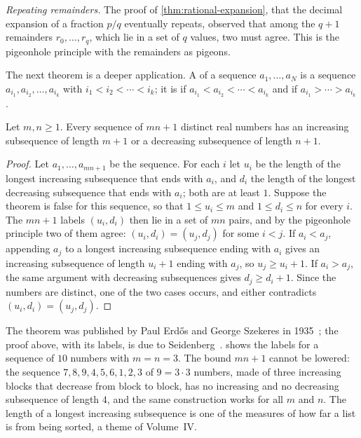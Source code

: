 \emph{Repeating remainders.} The proof of \cref{thm:rational-expansion}, that the decimal expansion of a fraction $p/q$ eventually repeats, observed that among the $q+1$ remainders $r_0,\ldots,r_q$, which lie in a set of $q$ values, two must agree. This is the pigeonhole principle with the remainders as pigeons.

The next theorem is a deeper application. A  of a sequence $a_1,\ldots,a_N$ is a sequence $a_{i_1},a_{i_2},\ldots,a_{i_k}$ with $i_1<i_2<\cdots<i_k$; it is  if $a_{i_1}<a_{i_2}<\cdots<a_{i_k}$ and  if $a_{i_1}>\cdots>a_{i_k}$.

\begin{theorem}
\label{thm:erdos-szekeres}
Let $m,n\ge1$. Every sequence of $mn+1$ distinct real numbers has an increasing subsequence of length $m+1$ or a decreasing subsequence of length $n+1$.
\end{theorem}

\begin{proof}
Let $a_1,\ldots,a_{mn+1}$ be the sequence. For each $i$ let $u_i$ be the length of the longest increasing subsequence that ends with $a_i$, and $d_i$ the length of the longest decreasing subsequence that ends with $a_i$; both are at least $1$. Suppose the theorem is false for this sequence, so that $1\le u_i\le m$ and $1\le d_i\le n$ for every $i$. The $mn+1$ labels $(u_i,d_i)$ then lie in a set of $mn$ pairs, and by the pigeonhole principle two of them agree: $(u_i,d_i)=(u_j,d_j)$ for some $i<j$. If $a_i<a_j$, appending $a_j$ to a longest increasing subsequence ending with $a_i$ gives an increasing subsequence of length $u_i+1$ ending with $a_j$, so $u_j\ge u_i+1$. If $a_i>a_j$, the same argument with decreasing subsequences gives $d_j\ge d_i+1$. Since the numbers are distinct, one of the two cases occurs, and either contradicts $(u_i,d_i)=(u_j,d_j)$.
\end{proof}

The theorem was published by Paul Erd\H{o}s and George Szekeres in 1935~\cite{erdos1935}; the proof above, with its labels, is due to Seidenberg~\cite{seidenberg1959}.  shows the labels for a sequence of $10$ numbers with $m=n=3$. The bound $mn+1$ cannot be lowered: the sequence $7,8,9,4,5,6,1,2,3$ of $9=3\cdot3$ numbers, made of three increasing blocks that decrease from block to block, has no increasing and no decreasing subsequence of length $4$, and the same construction works for all $m$ and $n$. The length of a longest increasing subsequence is one of the measures of how far a list is from being sorted, a theme of Volume~IV.

